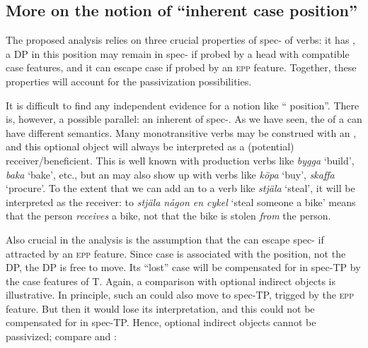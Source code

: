\documentclass[output=paper]{langscibook}
\begin{document}
\subsection{More on the notion of “inherent case position”}\label{sec:falk:4.4}


The proposed analysis relies on three crucial properties of spec- of  verbs: it has , a DP in this position may remain in spec- if probed by a head with compatible case features, and it can escape case if probed by an \textsc{epp} feature. Together, these properties will account for the passivization possibilities.


It is difficult to find any independent evidence for a notion like “ position”. There is, however, a possible parallel: an inherent  of spec-. As we have seen, the  of a  can have different semantics. Many monotransitive verbs may be construed with an , and this optional object will always be interpreted as a (potential) receiver/beneficient. This is well known with production verbs like \textit{bygga} ‘build’, \textit{baka} ‘bake’, etc., but an  may also show up with verbs like \textit{köpa} ‘buy’, \textit{skaffa} ‘procure’. To the extent that we can add an  to a verb like \textit{stjäla} ‘steal’, it will be interpreted as the receiver: to \textit{stjäla någon en cykel} ‘steal someone a bike’ means that the person \textit{receives} a bike, not that the bike is stolen \textit{from} the person. 



Also crucial in the analysis is the assumption that the  can escape spec- if attracted by an \textsc{epp} feature. Since case is associated with the position, not the DP, the DP is free to move. Its “lost” case will be compensated for in spec-TP by the case features of T. Again, a comparison with optional indirect objects is illustrative. In principle, such an  could also move to spec-TP, trigged by the \textsc{epp} feature. But then it would lose its interpretation, and this could not be compensated for in spec-TP. Hence, optional indirect objects cannot be passivized; compare  and :


\ea%
    \label{ex:falk:23}
\end{document}
